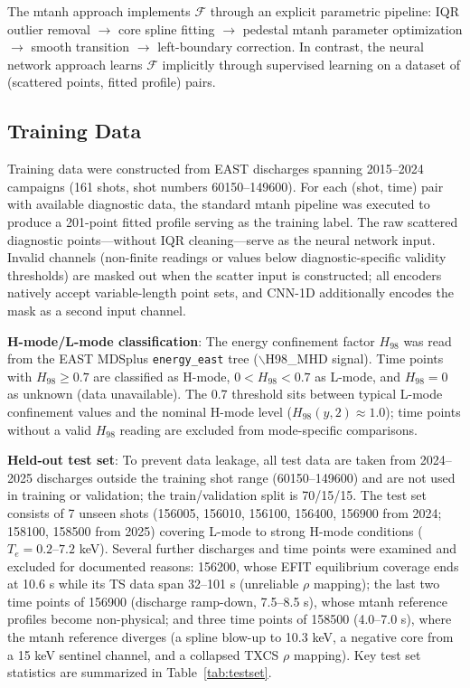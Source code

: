 \documentclass[a4paper,12pt]{article}
\begin{document}
The mtanh approach implements $\mathcal{F}$ through an explicit parametric pipeline: IQR outlier removal $\to$ core spline fitting $\to$ pedestal mtanh parameter optimization $\to$ smooth transition $\to$ left-boundary correction. In contrast, the neural network approach learns $\mathcal{F}$ implicitly through supervised learning on a dataset of (scattered points, fitted profile) pairs.

\subsection{Training Data}

Training data were constructed from EAST discharges spanning 2015--2024 campaigns (161 shots, shot numbers 60150--149600). For each (shot, time) pair with available diagnostic data, the standard mtanh pipeline was executed to produce a 201-point fitted profile serving as the training label. The raw scattered diagnostic points---without IQR cleaning---serve as the neural network input. Invalid channels (non-finite readings or values below diagnostic-specific validity thresholds) are masked out when the scatter input is constructed; all encoders natively accept variable-length point sets, and CNN-1D additionally encodes the mask as a second input channel.

\textbf{H-mode/L-mode classification}: The energy confinement factor $H_{98}$ was read from the EAST MDSplus \texttt{energy\_east} tree ($\backslash$H98\_MHD signal). Time points with $H_{98} \geq 0.7$ are classified as H-mode, $0 < H_{98} < 0.7$ as L-mode, and $H_{98} = 0$ as unknown (data unavailable). The 0.7 threshold sits between typical L-mode confinement values and the nominal H-mode level ($H_{98}(y,2) \approx 1.0$); time points without a valid $H_{98}$ reading are excluded from mode-specific comparisons.

\textbf{Held-out test set}: To prevent data leakage, all test data are taken from 2024--2025 discharges outside the training shot range (60150--149600) and are not used in training or validation; the train/validation split is 70/15/15. The test set consists of 7 unseen shots (156005, 156010, 156100, 156400, 156900 from 2024; 158100, 158500 from 2025) covering L-mode to strong H-mode conditions ($T_e = 0.2$--$7.2$ keV). Several further discharges and time points were examined and excluded for documented reasons: 156200, whose EFIT equilibrium coverage ends at 10.6 s while its TS data span 32--101 s (unreliable $\rho$ mapping); the last two time points of 156900 (discharge ramp-down, 7.5--8.5 s), whose mtanh reference profiles become non-physical; and three time points of 158500 (4.0--7.0 s), where the mtanh reference diverges (a spline blow-up to 10.3 keV, a negative core from a 15 keV sentinel channel, and a collapsed TXCS $\rho$ mapping). Key test set statistics are summarized in Table~\ref{tab:testset}.
\end{document}
